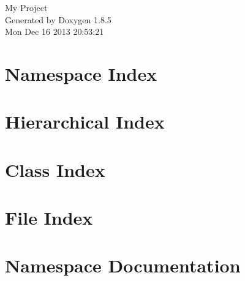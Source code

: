 \documentclass[twoside]{book}
\newcommand{\clearemptydoublepage}{%
  \newpage{\pagestyle{empty}\cleardoublepage}%
}
\begin{document}
\hypersetup{pageanchor=false}
\begin{titlepage}
\vspace*{7cm}
\begin{center}%
{\Large My Project }\\
\vspace*{1cm}
{\large Generated by Doxygen 1.8.5}\\
\vspace*{0.5cm}
{\small Mon Dec 16 2013 20:53:21}\\
\end{center}
\end{titlepage}
\clearemptydoublepage
\tableofcontents
\clearemptydoublepage
{}
\hypersetup{pageanchor=true}

\chapter{Namespace Index}

\chapter{Hierarchical Index}

\chapter{Class Index}

\chapter{File Index}

\chapter{Namespace Documentation}




\end{document}
